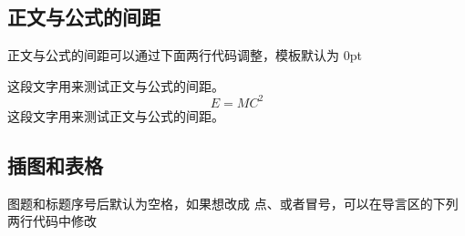\documentclass[a4paper,zihao=-4]{article}
\begin{document}
\begin{spacing}{1.3} %
	 \songti
	
	
	\vspace{11bp}
\end{spacing}

\subsection{正文与公式的间距}
正文与公式的间距可以通过下面两行代码调整，模板默认为 0pt

\setlength{\abovedisplayskip}{0pt}
\setlength{\belowdisplayskip}{0pt}

这段文字用来测试正文与公式的间距。
\begin{equation}
	E = MC^2
\end{equation}
这段文字用来测试正文与公式的间距。

\subsection{插图和表格}
图题和标题序号后默认为空格，如果想改成 点、或者冒号，可以在导言区的下列两行代码中修改
\end{document}
